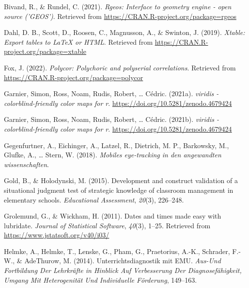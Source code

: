 \documentclass[
  man]{apa6}
\newlength{\cslhangindent}
\newlength{\cslentryspacingunit} %
\newenvironment{CSLReferences}[2] %
 {%
  \setlength{\parindent}{0pt}
  \ifodd #1
  \let\oldpar\par
  \def\par{\hangindent=\cslhangindent\oldpar}
  \fi
  \setlength{\parskip}{#2\cslentryspacingunit}
 }%
 {}
\begin{document}
\begin{CSLReferences}{1}{0}
\leavevmode{}%
Bivand, R., \& Rundel, C. (2021). \emph{Rgeos: Interface to geometry engine - open source ('GEOS')}. Retrieved from \url{https://CRAN.R-project.org/package=rgeos}

\leavevmode{}%
Dahl, D. B., Scott, D., Roosen, C., Magnusson, A., \& Swinton, J. (2019). \emph{Xtable: Export tables to LaTeX or HTML}. Retrieved from \url{https://CRAN.R-project.org/package=xtable}

\leavevmode{}%
Fox, J. (2022). \emph{Polycor: Polychoric and polyserial correlations}. Retrieved from \url{https://CRAN.R-project.org/package=polycor}

\leavevmode{}%
Garnier, Simon, Ross, Noam, Rudis, Robert, \ldots{} Cédric. (2021a). \emph{{viridis} - colorblind-friendly color maps for r}. \url{https://doi.org/10.5281/zenodo.4679424}

\leavevmode{}%
Garnier, Simon, Ross, Noam, Rudis, Robert, \ldots{} Cédric. (2021b). \emph{{viridis} - colorblind-friendly color maps for r}. \url{https://doi.org/10.5281/zenodo.4679424}

\leavevmode{}%
Gegenfurtner, A., Eichinger, A., Latzel, R., Dietrich, M. P., Barkowsky, M., Glufke, A., \ldots{} Stern, W. (2018). \emph{Mobiles eye-tracking in den angewandten wissenschaften}.

\leavevmode{}%
Gold, B., \& Holodynski, M. (2015). Development and construct validation of a situational judgment test of strategic knowledge of classroom management in elementary schools. \emph{Educational Assessment}, \emph{20}(3), 226--248.

\leavevmode{}%
Grolemund, G., \& Wickham, H. (2011). Dates and times made easy with {lubridate}. \emph{Journal of Statistical Software}, \emph{40}(3), 1--25. Retrieved from \url{https://www.jstatsoft.org/v40/i03/}

\leavevmode{}%
Helmke, A., Helmke, T., Lenske, G., Pham, G., Praetorius, A.-K., Schrader, F.-W., \& AdeThurow, M. (2014). Unterrichtsdiagnostik mit EMU. \emph{Aus-Und Fortbildung Der Lehrkr{ä}fte in Hinblick Auf Verbesserung Der Diagnosef{ä}higkeit, Umgang Mit Heterogenit{ä}t Und Individuelle F{ö}rderung}, 149--163.


\end{CSLReferences}
\end{document}
